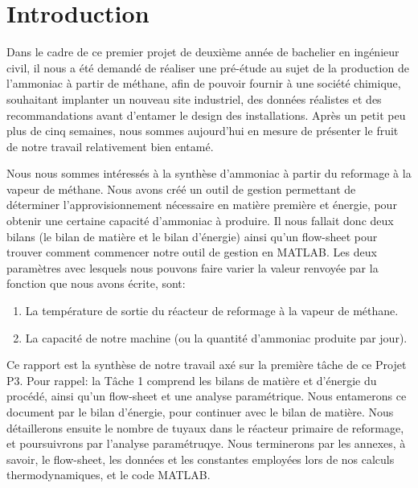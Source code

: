 \section{Introduction}

Dans le cadre de ce premier projet de deuxième année de bachelier en ingénieur civil, il nous a été demandé
de réaliser une pré-étude au sujet de la production de l’ammoniac à partir de méthane, afin de pouvoir fournir
à une société chimique, souhaitant implanter un nouveau site industriel, des données réalistes et des recommandations
avant d’entamer le design des installations. Après un petit peu plus de cinq semaines, nous sommes aujourd'hui en
mesure de présenter le fruit de notre travail relativement bien entamé. 

Nous nous sommes intéressés à la synthèse d’ammoniac à partir du reformage à la vapeur de méthane. Nous avons
créé un outil de gestion permettant de déterminer l’approvisionnement nécessaire en matière première et énergie, pour
obtenir une certaine capacité d'ammoniac à produire. Il nous fallait donc deux bilans (le bilan de matière et le
bilan d'énergie) ainsi qu'un flow-sheet pour trouver comment commencer notre outil de gestion en \textsc{MATLAB}. Les
deux paramètres avec lesquels nous pouvons faire varier la valeur renvoyée par la fonction que nous avons écrite, sont:

\begin{enumerate}
\item La température de sortie du réacteur de reformage à la vapeur de 
méthane.
\item La capacité de notre machine (ou la quantité d'ammoniac  produite par jour).
\end{enumerate}


Ce rapport est la synthèse de notre travail axé sur la première tâche de ce Projet P3. Pour rappel: la Tâche 1 comprend
les bilans de matière et d’énergie du procédé, ainsi qu'un flow-sheet et une analyse paramétrique. Nous entamerons ce
document par le bilan d'énergie, pour continuer avec le bilan de matière. Nous détaillerons ensuite le nombre de tuyaux
dans le réacteur primaire de reformage, et poursuivrons par l'analyse paramétruqye. Nous terminerons par les annexes, à
savoir, le flow-sheet, les données et les constantes employées lors de nos calculs thermodynamiques, et le code \textsc{MATLAB}.		
